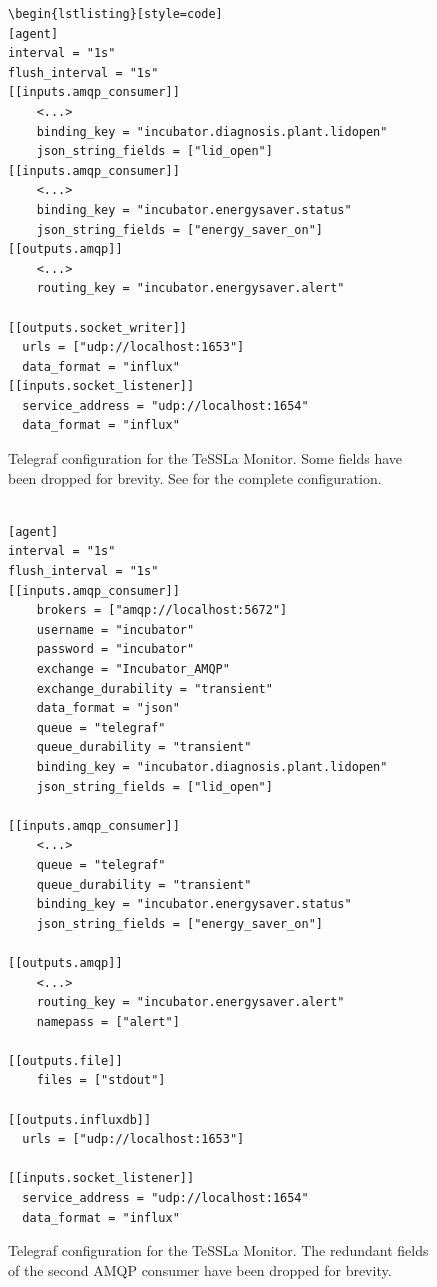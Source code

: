 \iffalse



	\begin{figure}[ht]
		\centering
		\begin{lstlisting}[style=code]
\begin{lstlisting}[style=code]
[agent]
interval = "1s"
flush_interval = "1s"
[[inputs.amqp_consumer]]
    <...>
	binding_key = "incubator.diagnosis.plant.lidopen"
	json_string_fields = ["lid_open"]
[[inputs.amqp_consumer]]
    <...>
	binding_key = "incubator.energysaver.status"
	json_string_fields = ["energy_saver_on"]
[[outputs.amqp]]
    <...>
	routing_key = "incubator.energysaver.alert"

[[outputs.socket_writer]]
  urls = ["udp://localhost:1653"]
  data_format = "influx"
[[inputs.socket_listener]]
  service_address = "udp://localhost:1654"
  data_format = "influx"
	\end{lstlisting}
		\caption{Telegraf configuration for the TeSSLa Monitor. Some fields have been dropped for brevity. See  for the complete configuration. }
	\end{figure}


	\begin{figure}[ht]
		\centering
		\begin{lstlisting}[style=code]

[agent]
interval = "1s"
flush_interval = "1s"
[[inputs.amqp_consumer]]
	brokers = ["amqp://localhost:5672"]
	username = "incubator"
	password = "incubator"
	exchange = "Incubator_AMQP"
	exchange_durability = "transient"
 	data_format = "json"
  	queue = "telegraf"
	queue_durability = "transient"
	binding_key = "incubator.diagnosis.plant.lidopen"
	json_string_fields = ["lid_open"]

[[inputs.amqp_consumer]]
    <...>
  	queue = "telegraf"
	queue_durability = "transient"
	binding_key = "incubator.energysaver.status"
	json_string_fields = ["energy_saver_on"]

[[outputs.amqp]]
    <...>
	routing_key = "incubator.energysaver.alert"
	namepass = ["alert"]

[[outputs.file]]
	files = ["stdout"]

[[outputs.influxdb]]
  urls = ["udp://localhost:1653"]

[[inputs.socket_listener]]
  service_address = "udp://localhost:1654"
  data_format = "influx"
	\end{lstlisting}
		\caption{Telegraf configuration for the TeSSLa Monitor. The redundant fields of the second AMQP consumer have been dropped for brevity.}
	\end{figure}

